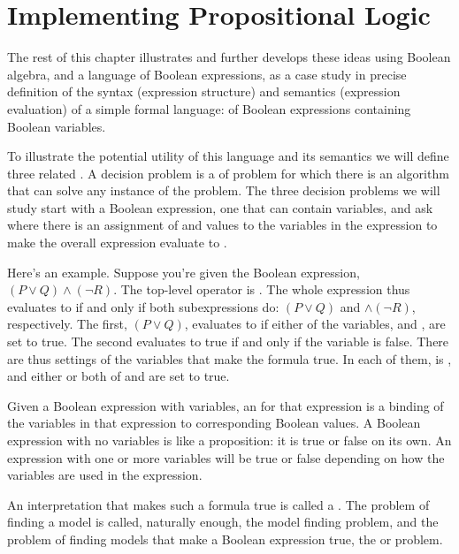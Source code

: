 \documentclass[letterpaper,10pt,english]{sphinxmanual}
\begin{document}
\section{Implementing Propositional Logic}
\label{\detokenize{09-propositional-logic:implementing-propositional-logic}}
The rest of this chapter illustrates and further develops these ideas
using Boolean algebra, and a language of Boolean expressions, as a
case study in precise definition of the syntax (expression structure)
and semantics (expression evaluation) of a simple formal language: of
Boolean expressions containing Boolean variables.

To illustrate the potential utility of this language and its semantics
we will define three related . A decision problem
is a  of problem for which there is an algorithm that can solve
any instance of the problem. The three decision problems we will study
start with a Boolean expression, one that can contain variables, and
ask where there is an assignment of  and  values to the
variables in the expression to make the overall expression evaluate to
.

Here’s an example. Suppose you’re given the Boolean expression,
\((P \lor Q) \land (\lnot R)\). The top-level operator is
. The whole expression thus evaluates to  if and only if
both subexpressions do: \((P \lor Q)\) and \(\land (\lnot
R)\), respectively. The first, \((P \lor Q)\), evaluates to 
if either of the variables,  and , are set to true. The second
evaluates to true if and only if the variable  is false. There are
thus settings of the variables that make the formula true. In each of
them,  is , and either or both of  and  are set to
true.

Given a Boolean expression with variables, an  for
that expression is a binding of the variables in that expression to
corresponding Boolean values. A Boolean expression with no variables
is like a proposition: it is true or false on its own. An expression
with one or more variables will be true or false depending on how the
variables are used in the expression.

An interpretation that makes such a formula true is called a .
The problem of finding a model is called, naturally enough, the model
finding problem, and the problem of finding  models that make a
Boolean expression true, the  or 
problem.
\end{document}
